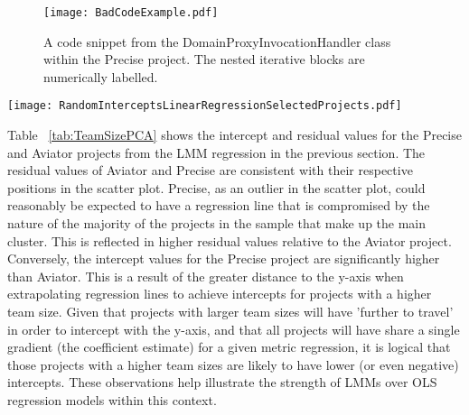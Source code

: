 \begin{figure}[htbp!] 
\centering    
\texttt{[image: BadCodeExample.pdf]}
\caption{A code snippet from the DomainProxyInvocationHandler class within the Precise project. The nested iterative blocks are numerically labelled.}
\label{fig:BadCodeExample}
\end{figure}

\begin{table}
\centering 
{}
\begin{tabular}
 \centering 
 \texttt{[image: RandomInterceptsLinearRegressionSelectedProjects.pdf]}
 \label{tab:RandomInterceptsLinearRegressionSelectedProjects}
\end{tabular}
\end{table}

Table ~\ref{tab:TeamSizePCA} shows the intercept and residual values for the Precise and Aviator projects from the LMM regression in the previous section. The residual values of Aviator and Precise are consistent with their respective positions in the scatter plot. Precise, as an outlier in the scatter plot, could reasonably be expected to have a regression line that is compromised by the nature of the majority of the projects in the sample that make up the main cluster. This is reflected in higher residual values relative to the Aviator project. Conversely, the intercept values for the Precise project are significantly higher than Aviator. This is a result of the greater distance to the y-axis when extrapolating regression lines to achieve intercepts for projects with a higher team size. Given that projects with larger team sizes will have 'further to travel' in order to intercept with the y-axis, and that all projects will  have share a single gradient (the coefficient estimate) for a given metric regression, it is logical that those projects with a higher team sizes are likely to have lower (or even negative) intercepts. These observations help illustrate the strength of LMMs over OLS regression models within this context.

